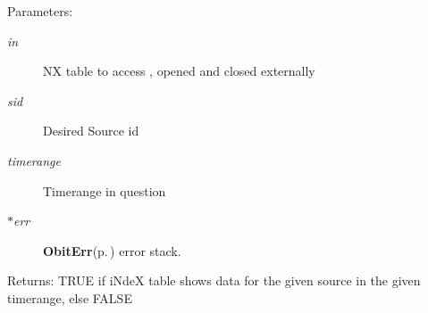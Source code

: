 \begin{Desc}
\item[Parameters:]
\begin{description}
\item[{\em in}]NX table to access , opened and closed externally \item[{\em sid}]Desired Source id \item[{\em timerange}]Timerange in question \item[{\em $\ast$err}]{\bf Obit\-Err}{\rm (p.\,\pageref{structObitErr})} error stack. \end{description}
\end{Desc}
\begin{Desc}
\item[Returns:]TRUE if i\-Nde\-X table shows data for the given source in the given timerange, else FALSE \end{Desc}
